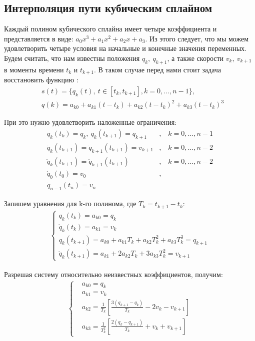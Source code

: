 \subsection{Интерполяция пути кубическим сплайном} \label{subsect2_2_1}
Каждый полином кубического сплайна имеет четыре коэффициента и представляется в виде: $a_{0}x^{3} + a_{1}x^{2} + a_{2}x + a_{3}$. Из этого следует, что мы можем удовлетворить четыре условия на начальные и конечные значения переменных. Будем считать, что нам известны положения $q_{k},\ q_{k+1}$, а также скорости $v_{k},\ v_{k+1}$ в моменты времени $t_{k}$ и $t_{k+1}$. В таком случае перед нами стоит задача восстановить функцию \cite{Biagiotti}:
\begin{align*}
	&s(t) = \{q_{k}(t),\ t \in [t_{k}, t_{k+1}],	k=0,\dotsc,n-1\},\\
	&q(k) = a_{k0} + a_{k1}(t - t_{k}) + a_{k2}(t - t_{k})^{2} + a_{k3}(t - t_{k})^{3}
\end{align*}

При это нужно удовлетворить наложенные ограничения:
\begin{align*}
	q_{k}(t_{k}) = q_{k},\ q_{k}(t_{k+1}) = q_{k+1}&,				&\	k=0,\dotsc,n-1\\
	\dot{q}_{k}(t_{k+1}) = \dot{q}_{k+1}(t_{k+1}) = v_{k+1}&,		&\	k=0,\dotsc,n-2\\
	\ddot{q}_{k}(t_{k+1}) = \ddot{q}_{k+1}(t_{k+1})&,				&\	k=0,\dotsc,n-2\\
	\dot{q}_{0}(t_{0}) = v_{0}&,\\
	\dot{q}_{n-1}(t_{n}) = v_{n}&
\end{align*}

Запишем уравнения для k-го полинома, где $T_{k} = t_{k+1} - t_{k}$:
\begin{align*}
	\begin{cases}
		q_{k}(t_{k}) = a_{k0} = q_{k}\\
		\dot{q}_{k}(t_{k}) = a_{k1} = v_{k}\\
		q_{k}(t_{k+1}) = a_{k0} + a_{k1}T_{k} + a_{k2}T_{k}^{2} + a_{k3}T_{k}^{3} = q_{k+1}\\
		\dot{q}_{k}(t_{k+1}) = a_{k1}+ 2a_{k2}T_{k} + 3a_{k3}T_{k}^{2} = v_{k+1}
	\end{cases}
\end{align*}

Разрешая систему относительно неизвестных коэффициентов, получим:
\begin{align*}
	\begin{cases}
		&a_{k0} = q_{k}\\
		&a_{k1} = v_{k}\\
		&a_{k2} = \frac{1}{T_{k}}[\frac{3(q_{k+1} - q_{k})}{T_{k}} - 2v_{k} - v_{k+1}]\\
		&a_{k3} = \frac{1}{T_{k}^2}[\frac{2(q_{k} - q_{k+1})}{T_{k}} + v_{k} + v_{k+1}]
	\end{cases}
\end{align*}

